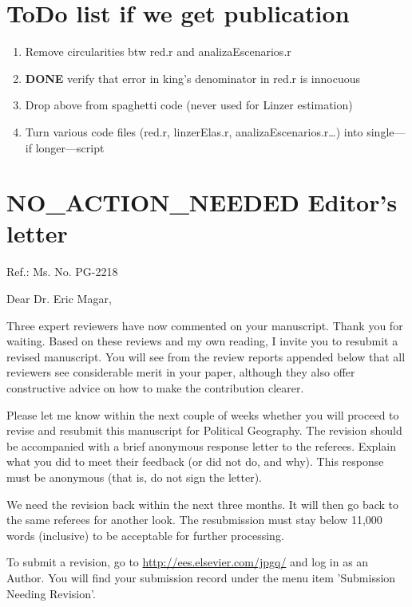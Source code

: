 \documentclass{article}
\begin{document}
\section{ToDo list if we get publication}
\label{sec:orgheadline46}
\begin{enumerate}
\item Remove circularities btw red.r and analizaEscenarios.r
\label{sec:orgheadline42}
\item {\bfseries\sffamily DONE} verify that error in king's denominator in red.r is innocuous
\label{sec:orgheadline43}
\item Drop above from spaghetti code (never used for Linzer estimation)
\label{sec:orgheadline44}

\item Turn various code files (red.r, linzerElas.r, analizaEscenarios.r\ldots{}) into single---if longer---script
\label{sec:orgheadline45}
\end{enumerate}
\section{{\bfseries\sffamily NO\_ACTION\_NEEDED} Editor's letter}
\label{sec:orgheadline47}
Ref.:  Ms. No. PG-2218

Dear Dr. Eric Magar,

Three expert reviewers have now commented on your manuscript. Thank you for waiting. Based on these reviews and my own reading, I invite you to resubmit a revised manuscript. You will see from the review reports appended below that all reviewers see considerable merit in your paper, although they also offer constructive advice on how to make the contribution clearer.

Please let me know within the next couple of weeks whether you will proceed to revise and resubmit this manuscript for Political Geography. The revision should be accompanied with a brief anonymous response letter to the referees. Explain what you did to meet their feedback (or did not do, and why). This response must be anonymous (that is, do not sign the letter).

We need the revision back within the next three months. It will then go back to the same referees for another look. The resubmission must stay below 11,000 words (inclusive) to be acceptable for further processing.

To submit a revision, go to \url{http://ees.elsevier.com/jpgq/} and log in as an Author.  You will find your submission record under the menu item 'Submission Needing Revision'.
\end{document}
